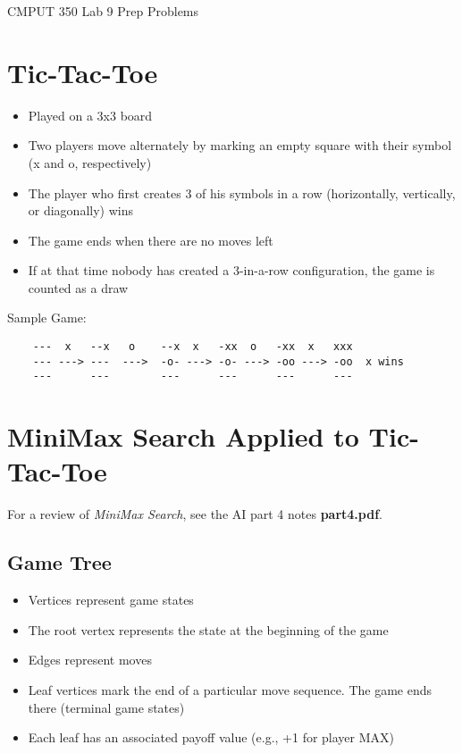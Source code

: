 \documentclass[a4paper,11pt]{article}
\begin{document}

\begin{center}
{\Large CMPUT 350 Lab 9 Prep Problems}
\end{center}


\linerule


\section*{Tic-Tac-Toe}
\begin{itemize}
    \item Played on a 3x3 board
    \item Two players move alternately by marking an empty square with their symbol
        (x and o, respectively)
    \item The player who first creates 3 of his symbols in a row (horizontally, vertically, or diagonally) wins
    \item The game ends when there are no moves left
    \item If at that time nobody has created a 3-in-a-row configuration, the game is counted as a draw
\end{itemize}

Sample Game:
\begin{verbatim}
    ---  x   --x   o    --x  x   -xx  o   -xx  x   xxx
    --- ---> ---  --->  -o- ---> -o- ---> -oo ---> -oo  x wins
    ---      ---        ---      ---      ---      ---
\end{verbatim}


\section*{MiniMax Search Applied to Tic-Tac-Toe}
For a review of \textit{MiniMax Search}, see the AI part 4 notes \textbf{part4.pdf}.

\subsection*{Game Tree}
\begin{itemize}
    \item Vertices represent game states
    \item The root vertex represents the state at the beginning of the game
    \item Edges represent moves
    \item Leaf vertices mark the end of a particular move sequence. 
        The game ends there (terminal game states)
    \item Each leaf has an associated payoff value (e.g., +1 for player MAX)
\end{itemize}
\end{document}
